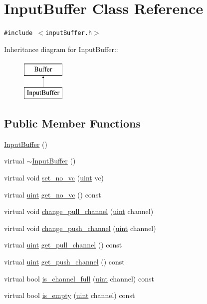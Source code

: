 \hypertarget{classInputBuffer}{
\section{InputBuffer Class Reference}
\label{classInputBuffer}
}
{\tt \#include $<$inputBuffer.h$>$}

Inheritance diagram for InputBuffer::\begin{figure}[H]
\begin{center}
\leavevmode
\includegraphics[height=2cm]{classInputBuffer}
\end{center}
\end{figure}
\subsection*{Public Member Functions}
\begin{CompactItemize}
\item 
\hyperlink{classInputBuffer_539e007478e6a19dd2c933e2fe6f6b5c}{InputBuffer} ()
\item 
virtual \hyperlink{classInputBuffer_c8e553cdc4097665450a7b83b797475c}{$\sim$InputBuffer} ()
\item 
virtual void \hyperlink{classInputBuffer_27ff9889e0ec93036b06b161f948bc8f}{set\_\-no\_\-vc} (\hyperlink{outputBuffer_8h_91ad9478d81a7aaf2593e8d9c3d06a14}{uint} vc)
\item 
virtual \hyperlink{outputBuffer_8h_91ad9478d81a7aaf2593e8d9c3d06a14}{uint} \hyperlink{classInputBuffer_2a76cc1cf7386e7d9bea7993660e7800}{get\_\-no\_\-vc} () const 
\item 
virtual void \hyperlink{classInputBuffer_86629ae58a881f42b19edfe07a53b8f0}{change\_\-pull\_\-channel} (\hyperlink{outputBuffer_8h_91ad9478d81a7aaf2593e8d9c3d06a14}{uint} channel)
\item 
virtual void \hyperlink{classInputBuffer_b63bf4f28edd8364edf000675bbf08ac}{change\_\-push\_\-channel} (\hyperlink{outputBuffer_8h_91ad9478d81a7aaf2593e8d9c3d06a14}{uint} channel)
\item 
virtual \hyperlink{outputBuffer_8h_91ad9478d81a7aaf2593e8d9c3d06a14}{uint} \hyperlink{classInputBuffer_b33dddf15a99bb33e22712b23c19cf82}{get\_\-pull\_\-channel} () const 
\item 
virtual \hyperlink{outputBuffer_8h_91ad9478d81a7aaf2593e8d9c3d06a14}{uint} \hyperlink{classInputBuffer_0c13c3b2a56799d78bf0961d74ad03a9}{get\_\-push\_\-channel} () const 
\item 
virtual bool \hyperlink{classInputBuffer_53d9799602c95d0b17b73e4b1d1b73d6}{is\_\-channel\_\-full} (\hyperlink{outputBuffer_8h_91ad9478d81a7aaf2593e8d9c3d06a14}{uint} channel) const 
\item 
virtual bool \hyperlink{classInputBuffer_bc130ab26e953ef77b7faa804388cb90}{is\_\-empty} (\hyperlink{outputBuffer_8h_91ad9478d81a7aaf2593e8d9c3d06a14}{uint} channel) const 
\end{CompactItemize}


